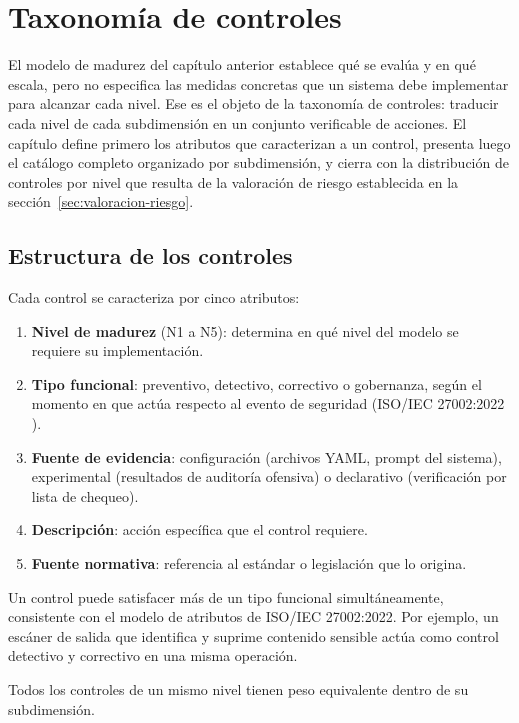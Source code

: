\chapter{Taxonomía de controles}
\label{ch:controles}

El modelo de madurez del capítulo anterior establece qué se evalúa y en qué escala, pero no especifica las medidas concretas que un sistema debe implementar para alcanzar cada nivel. Ese es el objeto de la taxonomía de controles: traducir cada nivel de cada subdimensión en un conjunto verificable de acciones. El capítulo define primero los atributos que caracterizan a un control, presenta luego el catálogo completo organizado por subdimensión, y cierra con la distribución de controles por nivel que resulta de la valoración de riesgo establecida en la sección~\ref{sec:valoracion-riesgo}.


\section{Estructura de los controles}

Cada control se caracteriza por cinco atributos:

\begin{enumerate}[leftmargin=2em]
  \item \textbf{Nivel de madurez} (N1 a N5): determina en qué nivel del modelo se requiere su implementación.
  \item \textbf{Tipo funcional}: preventivo, detectivo, correctivo o gobernanza, según el momento en que actúa respecto al evento de seguridad (ISO/IEC 27002:2022 \cite{iso27002}).
  \item \textbf{Fuente de evidencia}: configuración (archivos YAML, prompt del sistema), experimental (resultados de auditoría ofensiva) o declarativo (verificación por lista de chequeo).
  \item \textbf{Descripción}: acción específica que el control requiere.
  \item \textbf{Fuente normativa}: referencia al estándar o legislación que lo origina.
\end{enumerate}

Un control puede satisfacer más de un tipo funcional simultáneamente, consistente con el modelo de atributos de ISO/IEC 27002:2022. Por ejemplo, un escáner de salida que identifica y suprime contenido sensible actúa como control detectivo y correctivo en una misma operación.

Todos los controles de un mismo nivel tienen peso equivalente dentro de su subdimensión.

